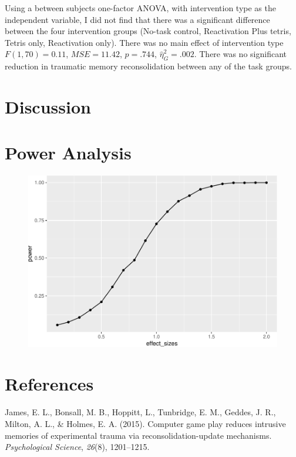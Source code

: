 \documentclass[man]{apa6}
\begin{document}
Using a between subjects one-factor ANOVA, with intervention type as the
independent variable, I did not find that there was a significant
difference between the four intervention groups (No-task control,
Reactivation Plus tetris, Tetris only, Reactivation only). There was no
main effect of intervention type \(F(1, 70) = 0.11\),
\(\mathit{MSE} = 11.42\), \(p = .744\), \(\hat{\eta}^2_G = .002\). There
was no significant reduction in traumatic memory reconsolidation between
any of the task groups.

\section{Discussion}\label{discussion}

\newpage

\section{Power Analysis}\label{power-analysis}

\begin{figure}
\centering
\includegraphics{Midterm_Paper_files/figure-latex/unnamed-chunk-2-1.pdf}
\caption{}
\end{figure}

\section{References}\label{references}

\begingroup
\setlength{\parindent}{-0.5in} \setlength{\leftskip}{0.5in}

\hypertarget{refs}{}
\hypertarget{ref-james2015computer}{}
James, E. L., Bonsall, M. B., Hoppitt, L., Tunbridge, E. M., Geddes, J.
R., Milton, A. L., \& Holmes, E. A. (2015). Computer game play reduces
intrusive memories of experimental trauma via reconsolidation-update
mechanisms. \emph{Psychological Science}, \emph{26}(8), 1201--1215.

\endgroup
\end{document}
